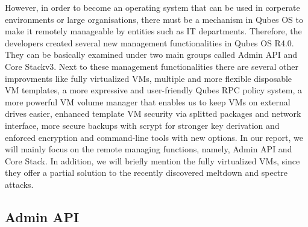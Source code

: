 \documentclass[runningheads,a4paper]{article}
\begin{document}
However, in order to become an operating system that can be used in
corperate environments or large organisations, there must be a
mechanism in Qubes OS to make it remotely manageable by entities such
as IT departments.  Therefore, the developers created several new
management functionalities in Qubes OS R4.0. They can be basically
examined under two main groups called Admin API and Core Stackv3. Next
to these management functionalities there are several other
improvments like fully virtualized VMs, multiple and more flexible
disposable VM templates, a more expressive and user-friendly Qubes RPC
policy system, a more powerful VM volume manager that enables us to
keep VMs on external drives easier, enhanced template VM security via
splitted packages and network interface, more secure backups with
scrypt for stronger key derivation and enforced encryption and
command-line tools with new options. In our report, we will mainly
focus on the remote managing functions, namely, Admin API and Core
Stack. In addition, we will briefly mention the fully virtualized VMs,
since they offer a partial solution to the recently discovered
meltdown and spectre attacks.

\subsection{Admin API} 
\end{document}
